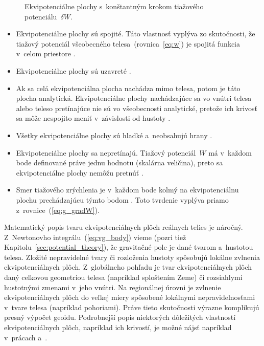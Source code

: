 \documentclass[a4paper, 12pt]{book}
\begin{document}
\begin{figure}
\centering

\caption{Ekvipotenciálne plochy s~konštantným krokom tiažového 
potenciálu~$\delta W$.}
\label{fig:equipotential_surfaces}
\end{figure}

\begin{itemize}
\item Ekvipotenciálne plochy sú spojité.  Táto vlastnosť vyplýva zo
skutočnosti, že tiažový potenciál všeobecného telesa~(rovnica~\ref{eq:w}) je 
spojitá funkcia v~celom priestore \parencite{MoritzPhysicalGeodesy}.

\item Ekvipotenciálne plochy sú uzavreté \parencite{VanicekGeodesy}.

\item Ak sa celá ekvipotenciálna plocha nachádza mimo telesa, potom je táto 
plocha analytická.  Ekvipotenciálne plochy nachádzajúce sa vo vnútri telesa 
alebo teleso pretínajúce nie sú vo všeobecnosti analytické, pretože ich krivosť 
sa môže nespojito meniť v~závislosti od hustoty 
\parencite{MoritzPhysicalGeodesy}.

\item Všetky ekvipotenciálne plochy sú hladké a~neobsahujú hrany
\parencite{MoritzPhysicalGeodesy}.

\item Ekvipotenciálne plochy sa nepretínajú.  Tiažový potenciál~$W$ má v~každom 
bode definované práve jednu hodnotu (skalárna veličina), preto sa 
ekvipotenciálne plochy nemôžu pretnúť \parencite{MacMillan1930}.

\item Smer tiažového zrýchlenia je v~každom bode kolmý na ekvipotenciálnu
plochu prechádzajúcu týmto bodom \parencite{MoritzPhysicalGeodesy}.  Toto 
tvrdenie vyplýva priamo z~rovnice~(\ref{eq:g_gradW}).
\end{itemize}

Matematický popis tvaru ekvipotenciálnych plôch reálnych telies je náročný.  
Z~Newtonovho integrálu~(\ref{eq:vg_body}) vieme (pozri tiež 
Kapitolu~\ref{sec:potential_theory}), že gravitačné pole je dané tvarom 
a~hustotou telesa.  Zložité nepravidelné tvary či rozloženia hustoty spôsobujú 
lokálne zvlnenia ekvipotenciálnych plôch.  Z~globálneho pohľadu je tvar 
ekvipotenciálnych plôch daný celkovou geometriou telesa (napríklad sploštením 
Zeme) či rozsiahlymi hustotnými zmenami v~jeho vnútri.  Na regionálnej úrovni 
je zvlnenie ekvipotenciálnych plôch do veľkej miery spôsobené lokálnymi 
nepravidelnosťami v~tvare telesa (napríklad pohoriami).  Práve tieto 
skutočnosti výrazne komplikujú presný výpočet geoidu.  Podrobnejší popis 
niektorých dôležitých vlastností ekvipotenciálnych plôch, napríklad ich 
krivostí, je možné nájsť napríklad v~prácach \textcite{MoritzPhysicalGeodesy} 
a~\textcite{Janak2006}.
\end{document}
